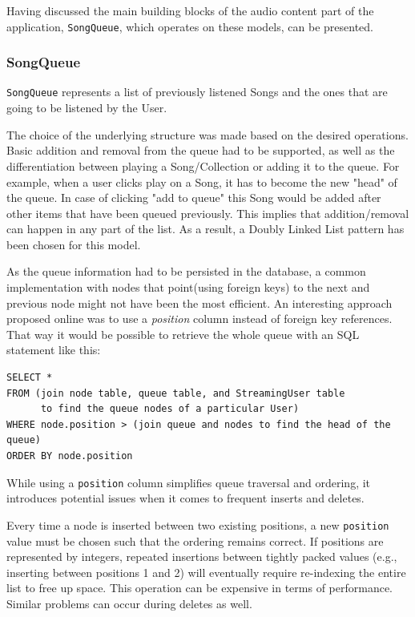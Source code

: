 Having discussed the main building blocks of the audio content part of the application,
\texttt{SongQueue}, which operates on these models, can be presented.

\subsubsection{SongQueue}
\texttt{SongQueue} represents a list of previously listened Songs and the ones that are going to be
listened by the User.

The choice of the underlying structure was made based on the desired operations.
Basic addition and removal from the queue had to be supported, as well as the differentiation
between playing a Song/Collection or adding it to the queue.
For example, when a user clicks play on a Song, it has to become the new "head" of the queue.
In case of clicking "add to queue" this Song would be added after other items
that have been queued previously. This implies that addition/removal can happen in any part
of the list. As a result, a Doubly Linked List pattern has been chosen for this model.

As the queue information had to be persisted in the database, a common implementation with
nodes that point(using foreign keys) to the next and previous node might not have been the most efficient. An interesting approach proposed online was to use a \textit{position} column
instead of foreign key references. That way it would be possible to retrieve the whole queue with an SQL statement
like this:

\begin{verbatim}
SELECT *
FROM (join node table, queue table, and StreamingUser table
      to find the queue nodes of a particular User)
WHERE node.position > (join queue and nodes to find the head of the queue)
ORDER BY node.position
\end{verbatim}

While using a \texttt{position} column simplifies queue traversal and ordering, it introduces potential
issues when it comes to frequent inserts and deletes.

Every time a node is inserted between two existing positions, a new \texttt{position} value must be chosen
such that the ordering remains correct. If positions are represented by integers, repeated insertions
between tightly packed values (e.g., inserting between positions 1 and 2) will eventually require
re-indexing the entire list to free up space. This operation can be expensive in terms of performance.
Similar problems can occur during deletes as well.

